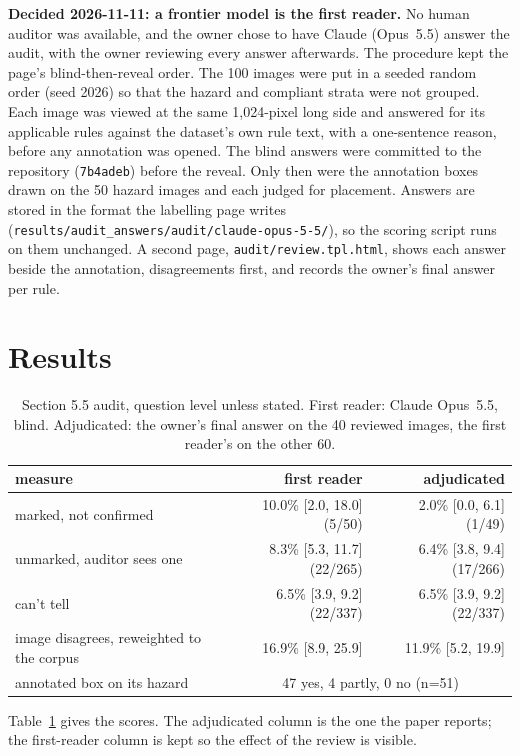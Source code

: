 \textbf{Decided 2026-11-11: a frontier model is the first reader.} No human auditor was available,
and the owner chose to have Claude (Opus~5.5) answer the audit, with the owner reviewing every answer
afterwards. The procedure kept the page's blind-then-reveal order. The 100 images were put in a seeded
random order (seed 2026) so that the hazard and compliant strata were not grouped. Each image was viewed at
the same 1,024-pixel long side and answered for its applicable rules against the dataset's own rule text,
with a one-sentence reason, before any annotation was opened. The blind answers were committed to the
repository (\texttt{7b4adeb}) before the reveal. Only then were the annotation boxes drawn on the 50 hazard
images and each judged for placement. Answers are stored in the format the labelling page writes
(\texttt{results/audit\_answers/audit/claude-opus-5-5/}), so the scoring script runs on them unchanged.
A second page, \texttt{audit/review.tpl.html}, shows each answer beside the annotation, disagreements
first, and records the owner's final answer per rule.

\section{Results}

\begin{table}[tbp]
\centering
\begin{tabular}{lrr}
\toprule
\textbf{measure} & \textbf{first reader} & \textbf{adjudicated} \\
\midrule
marked, not confirmed & 10.0\% [2.0, 18.0] (5/50) & 2.0\% [0.0, 6.1] (1/49) \\
unmarked, auditor sees one & 8.3\% [5.3, 11.7] (22/265) & 6.4\% [3.8, 9.4] (17/266) \\
can't tell & 6.5\% [3.9, 9.2] (22/337) & 6.5\% [3.9, 9.2] (22/337) \\
image disagrees, reweighted to the corpus & 16.9\% [8.9, 25.9] & 11.9\% [5.2, 19.9] \\
annotated box on its hazard & \multicolumn{2}{c}{47 yes, 4 partly, 0 no (n=51)} \\
\bottomrule
\end{tabular}
\caption{Section 5.5 audit, question level unless stated. First reader: Claude Opus~5.5, blind.
Adjudicated: the owner's final answer on the 40 reviewed images, the first reader's on the other 60.}
\label{tab:s26}
\end{table}

Table~\ref{tab:s26} gives the scores. The adjudicated column is the one the paper reports; the first-reader
column is kept so the effect of the review is visible.

